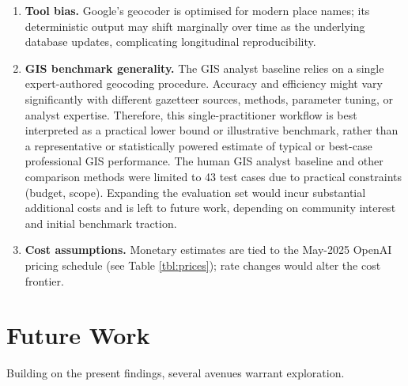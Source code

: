 \begin{enumerate}
{  Tokenization/decoding and tool‑call semantics differ across providers
  even when hyperparameters share names, so mixing vendors would add
  noise and weaken internal validity for accuracy/cost/latency
  comparisons. Generalization to other families (e.g., Llama, Mistral)
  is left to future replication under matched settings.
}\item
  \DIFaddend \textbf{Tool bias.} Google's geocoder is optimised for modern place
  names; its deterministic output may shift marginally over time as the
  underlying database updates, complicating longitudinal
  reproducibility.
\item
  \textbf{GIS benchmark generality.} The GIS analyst baseline
  \citep{Bashorun2025_gis} relies on a single expert-authored geocoding
  procedure. Accuracy and efficiency might vary significantly with
  different gazetteer sources, methods, parameter tuning, or analyst
  expertise. Therefore, this single-practitioner workflow is best
  interpreted as a practical lower bound or illustrative benchmark,
  rather than a representative or statistically powered estimate of
  typical or best-case professional GIS performance. The human GIS
  analyst baseline and other comparison methods were limited to 43 test
  cases due to practical constraints (budget, scope). Expanding the
  evaluation set would incur substantial additional costs and is left to
  future work, depending on community interest and initial benchmark
  traction.
\item
  \textbf{Cost assumptions.} Monetary estimates are tied to the May-2025
  OpenAI pricing schedule (see Table \ref{tbl:prices}); rate changes
  would alter the cost frontier.
\end{enumerate}

\section{Future Work}\label{future-work}

Building on the present findings, several avenues warrant exploration.

